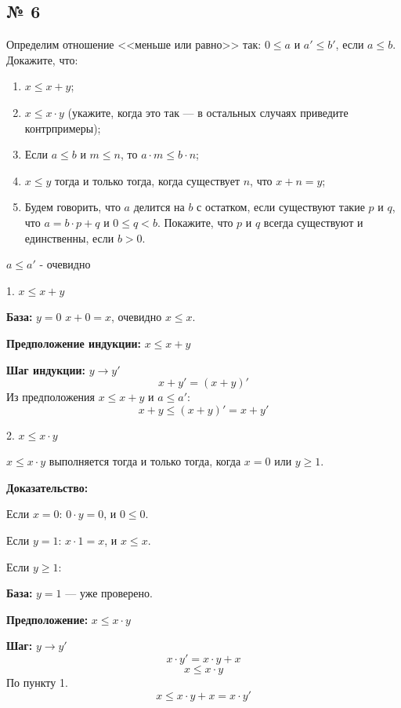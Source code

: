 \newpage
\subsection{№ 6}

Определим отношение <<меньше или равно>> так: $0 \le a$ и $a' \le b'$, если $a \le b$. Докажите, что:
\begin{enumerate}
\item $x \le x+y$;
\item $x \le x \cdot y$ (укажите, когда это так --- в остальных случаях приведите контрпримеры);
\item Если $a \le b$ и $m \le n$, то $a \cdot m \le b \cdot n$;
\item $x \le y$ тогда и только тогда, когда существует $n$, что $x + n = y$;
\item Будем говорить, что $a$ делится на $b$ с остатком, если существуют такие $p$ и $q$, что 
$a = b \cdot p + q$ и $0 \le q < b$. Покажите, что $p$ и $q$ всегда существуют и единственны,
если $b > 0$.
\end{enumerate}

$a \leq a'$ - очевидно


1. \( x \le x + y \)



\textbf{База:} \( y = 0 \)  
  \( x + 0 = x \), очевидно \( x \le x \). 

\textbf{Предположение индукции:} \( x \le x + y \)

\textbf{Шаг индукции:} \( y \to y' \)  
  \[
  x + y' = (x + y)'
  \]  
  Из предположения \( x \le x + y \) и  \( a \le a' \):  
  \[
  x + y \le (x + y)' = x + y'
  \]  


2. \( x \le x \cdot y \)

\( x \le x \cdot y \) выполняется тогда и только тогда, когда \( x = 0 \) или \( y \ge 1 \).

\textbf{Доказательство:}

Если \( x = 0 \):  
  \( 0 \cdot y = 0 \), и \( 0 \le 0 \). 

 Если \( y = 1 \):  
  \( x \cdot 1 = x \), и \( x \le x \). 

 Если \( y \ge 1 \):  

  \textbf{База:} \( y = 1 \) — уже проверено.  
  
  \textbf{Предположение:} \( x \le x \cdot y \)
  
  \textbf{Шаг:} \( y \to y' \)  
  \[
  x \cdot y' = x \cdot y + x
  \]  
  \[
  x \le x \cdot y 
  \]
  По пункту 1.
  \[
  x \le x \cdot y + x = x \cdot y'
  \]


